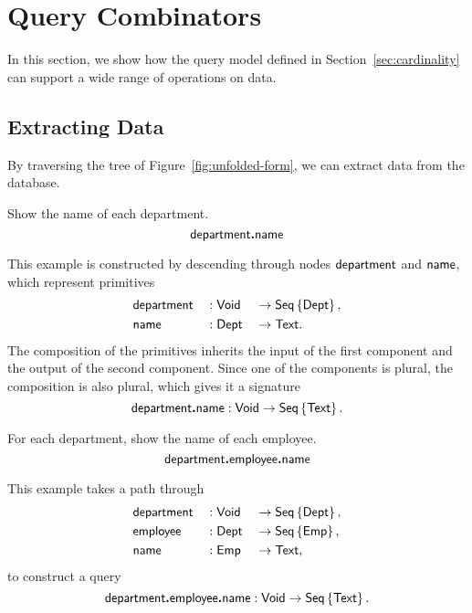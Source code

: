 
\section{Query Combinators}
\label{sec:combinators}

In this section, we show how the query model defined in
Section~\ref{sec:cardinality} can support a wide range of operations on data.

\subsection*{Extracting Data}

By traversing the tree of Figure~\ref{fig:unfolded-form}, we can extract data
from the database.

\begin{example}
    \label{ex:department-name}
    Show the name of each department.
    \begin{equation*}
        \textup{\textsf{department}}\boldsymbol{.}\textup{\textsf{name}}
    \end{equation*}
\end{example}

This example is constructed by descending through nodes $\textup{\textsf{department}}$ and
$\textup{\textsf{name}}$, which represent primitives
\begin{alignat*}{3}
    & \textup{\textsf{department}} && : \textup{\textsf{Void}} && \to \textup{\textsf{Seq}}\left\{\textup{\textsf{Dept}}\right\}, \\
    & \textup{\textsf{name}} && : \textup{\textsf{Dept}} && \to \textup{\textsf{Text}}.
\end{alignat*}
The composition of the primitives inherits the input of the first component and
the output of the second component.  Since one of the components is plural, the
composition is also plural, which gives it a signature
\begin{equation*}
    \textup{\textsf{department}}\boldsymbol{.}\textup{\textsf{name}} : \textup{\textsf{Void}} \to \textup{\textsf{Seq}}\left\{\textup{\textsf{Text}}\right\}.
\end{equation*}

\begin{example}
    \label{ex:department-employee-name}
    For each department, show the name of each employee.
    \begin{equation*}
        \textup{\textsf{department}}\boldsymbol{.}\textup{\textsf{employee}}\boldsymbol{.}\textup{\textsf{name}}
    \end{equation*}
\end{example}

This example takes a path through
\begin{alignat*}{3}
    & \textup{\textsf{department}} && : \textup{\textsf{Void}} && \to \textup{\textsf{Seq}}\left\{\textup{\textsf{Dept}}\right\}, \\
    & \textup{\textsf{employee}} && : \textup{\textsf{Dept}} && \to \textup{\textsf{Seq}}\left\{\textup{\textsf{Emp}}\right\}, \\
    & \textup{\textsf{name}} && : \textup{\textsf{Emp}} && \to \textup{\textsf{Text}},
\end{alignat*}
to construct a query
\begin{equation*}
    \textup{\textsf{department}}\boldsymbol{.}\textup{\textsf{employee}}\boldsymbol{.}\textup{\textsf{name}} : \textup{\textsf{Void}} \to \textup{\textsf{Seq}}\left\{\textup{\textsf{Text}}\right\}.
\end{equation*}

